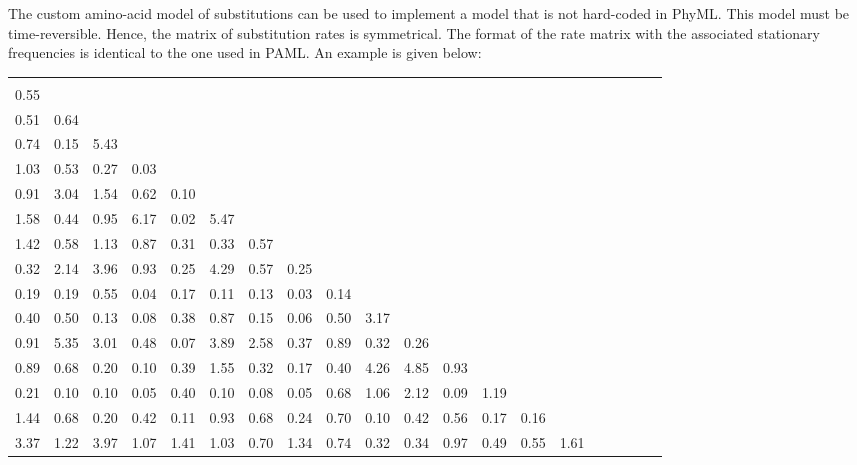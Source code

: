 \documentclass[a4paper,12pt]{article}
\begin{document}
The custom amino-acid model of substitutions can be used to implement a model that is not hard-coded
in  PhyML.   This model  must  be  time-reversible.  Hence,  the  matrix  of  substitution rates  is
symmetrical. The format  of the rate matrix with the associated  stationary frequencies is identical
to the one used in PAML. An example is given below:

\begin{center}
{\tiny
\begin{tabular}{p{0.33cm}p{0.33cm}p{0.33cm}p{0.33cm}p{0.33cm}p{0.33cm}p{0.33cm}p{0.33cm}p{0.33cm}p{0.33cm}p{0.33cm}p{0.33cm}p{0.33cm}p{0.33cm}p{0.33cm}p{0.33cm}p{0.33cm}p{0.33cm}p{0.33cm}p{0.33cm}}
  &&&&&&&&&&&&&&&&&&& \\
0.55 &  &&&&&&&&&&&&&&&&&& \\
0.51 & 0.64 &  &&&&&&&&&&&&&&&& \\
0.74 & 0.15 & 5.43 &  &&&&&&&&&&&&&&&& \\
1.03 & 0.53 & 0.27 & 0.03 &  &&&&&&&&&&&&&&& \\
0.91 & 3.04 & 1.54 & 0.62 & 0.10 &   &&&&&&&&&&&&&& \\
1.58 & 0.44 & 0.95 & 6.17 & 0.02 & 5.47 &  &&&&&&&&&&&&& \\
1.42 & 0.58 & 1.13 & 0.87 & 0.31 & 0.33 & 0.57 &  &&&&&&&&&&&& \\
0.32 & 2.14 & 3.96 & 0.93 & 0.25 & 4.29 & 0.57 & 0.25 &  &&&&&&&&&&& \\
0.19 & 0.19 & 0.55 & 0.04 & 0.17 & 0.11 & 0.13 & 0.03 & 0.14 &  &&&&&&&&&& \\
0.40 & 0.50 & 0.13 & 0.08 & 0.38 & 0.87 & 0.15 & 0.06 & 0.50 & 3.17 &  &&&&&&&&& \\
0.91 & 5.35 & 3.01 & 0.48 & 0.07 & 3.89 & 2.58 & 0.37 & 0.89 & 0.32 & 0.26 &  &&&&&&&& \\
0.89 & 0.68 & 0.20 & 0.10 & 0.39 & 1.55 & 0.32 & 0.17 & 0.40 & 4.26 & 4.85 & 0.93 &  &&&&&&& \\
0.21 & 0.10 & 0.10 & 0.05 & 0.40 & 0.10 & 0.08 & 0.05 & 0.68 & 1.06 & 2.12 & 0.09 & 1.19 &  &&&&&& \\
1.44 & 0.68 & 0.20 & 0.42 & 0.11 & 0.93 & 0.68 & 0.24 & 0.70 & 0.10 & 0.42 & 0.56 & 0.17 & 0.16 &  &&&&& \\
3.37 & 1.22 & 3.97 & 1.07 & 1.41 & 1.03 & 0.70 & 1.34 & 0.74 & 0.32 & 0.34 & 0.97 & 0.49 & 0.55 & 1.61 &  &&&& \\

\end{tabular}}
\end{center}
\end{document}
